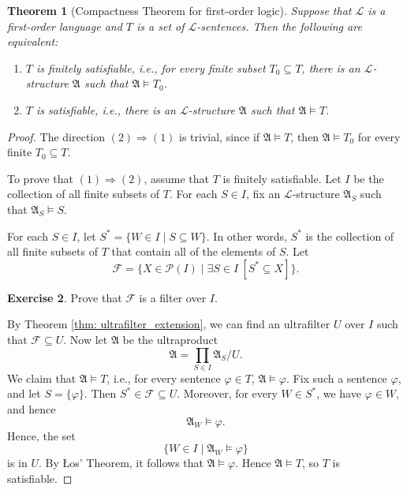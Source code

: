 \documentclass[a4paper]{memoir}
\newtheorem{theorem}{Theorem}[section]
\theoremstyle{definition}
\newtheorem{exercise}[theorem]{Exercise}
\newcommand{\mc}{\mathcal}
\newcommand{\power}{\ensuremath{\mathscr{P}}}
\begin{document}
\begin{theorem}[Compactness Theorem for first-order logic]
  Suppose that $\mc{L}$ is a first-order language and $T$ is a set of $\mc{L}$-sentences. Then the 
  following are equivalent:
  \begin{enumerate}
    \item $T$ is finitely satisfiable, i.e., for every finite subset $T_0 \subseteq T$, there is an 
    $\mc{L}$-structure $\mathfrak{A}$ such that $\mathfrak{A} \models T_0$.
    \item $T$ is satisfiable, i.e., there is an $\mc{L}$-structure $\mathfrak{A}$ such that 
    $\mathfrak{A} \models T$.
  \end{enumerate}
\end{theorem}

\begin{proof}
  The direction $(2) \Rightarrow (1)$ is trivial, since if $\mathfrak{A} \models T$, 
  then $\mathfrak{A} \models T_0$ for every finite $T_0 \subseteq T$. 
  
  To prove that $(1) \Rightarrow (2)$, assume that $T$ is finitely satisfiable. Let 
  $I$ be the collection of all finite subsets of $T$. For each $S \in I$, fix an 
  $\mc{L}$-structure $\mathfrak{A}_S$ such that $\mathfrak{A}_S \models S$.
  
  For each $S \in I$, let $S^* = \{W \in I \mid S \subseteq W\}$. In other words, 
  $S^*$ is the collection of all finite subsets of $T$ that contain all of the elements of 
  $S$. Let 
  \[
    \mc{F} = \{X \in \power(I) \mid \exists S \in I \ [S^* \subseteq X]\}.
  \]
  
  \begin{exercise}
    Prove that $\mc{F}$ is a filter over $I$.
  \end{exercise}
  
  By Theorem \ref{thm: ultrafilter_extension}, we can find an ultrafilter $U$ over $I$ 
  such that $\mc{F} \subseteq U$. Now let $\mathfrak{A}$ be the ultraproduct
  \[
    \mathfrak{A} = \prod_{S \in I} \mathfrak{A}_S / U.
  \]
  We claim that $\mathfrak{A} \models T$, i.e., for every sentence $\varphi \in T$, 
  $\mathfrak{A} \models \varphi$. Fix such a sentence $\varphi$, and let 
  $S = \{\varphi\}$. Then $S^* \in \mc{F} \subseteq U$. Moreover, for every 
  $W \in S^*$, we have $\varphi \in W$, and hence 
  \[
    \mathfrak{A}_W \models \varphi.
  \]
  Hence, the set
  \[
    \{W \in I \mid \mathfrak{A}_W \models \varphi\}
  \]
  is in $U$. By \L os' Theorem, it follows that $\mathfrak{A} \models \varphi$. 
  Hence $\mathfrak{A} \models T$, so $T$ is satisfiable.
\end{proof}
\end{document}
